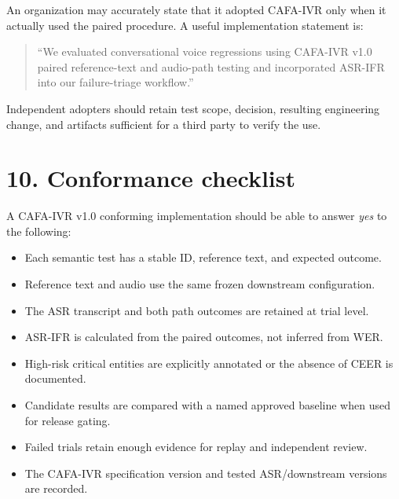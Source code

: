 \documentclass[10pt]{article}
\begin{document}
An organization may accurately state that it adopted CAFA-IVR only when it actually used the paired procedure. A useful implementation statement is:

\begin{quote}\small
``We evaluated conversational voice regressions using CAFA-IVR v1.0 paired reference-text and audio-path testing and incorporated ASR-IFR into our failure-triage workflow.''
\end{quote}

Independent adopters should retain test scope, decision, resulting engineering change, and artifacts sufficient for a third party to verify the use.

\section*{10. Conformance checklist}
A CAFA-IVR v1.0 conforming implementation should be able to answer \emph{yes} to the following:
\begin{itemize}
\item Each semantic test has a stable ID, reference text, and expected outcome.
\item Reference text and audio use the same frozen downstream configuration.
\item The ASR transcript and both path outcomes are retained at trial level.
\item ASR-IFR is calculated from the paired outcomes, not inferred from WER.
\item High-risk critical entities are explicitly annotated or the absence of CEER is documented.
\item Candidate results are compared with a named approved baseline when used for release gating.
\item Failed trials retain enough evidence for replay and independent review.
\item The CAFA-IVR specification version and tested ASR/downstream versions are recorded.
\end{itemize}
\end{document}
